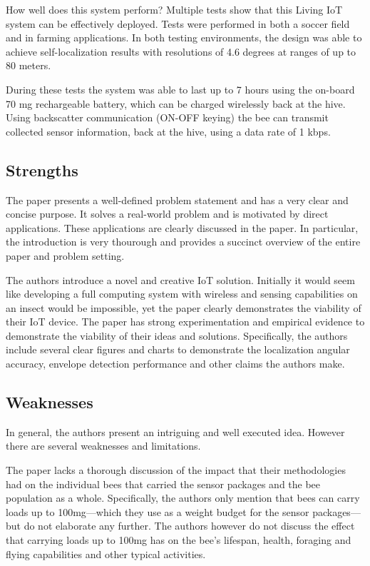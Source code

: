 \documentclass[letterpaper,twocolumn,10pt]{article}
\begin{document}
How well does this system perform? Multiple tests show that this Living IoT system can be effectively deployed. Tests were performed in both a soccer field and in farming applications. In both testing environments, the design was able to achieve self-localization results with resolutions of 4.6 degrees at ranges of up to 80 meters. 

During these tests the system was able to last up to 7 hours using the on-board 70 mg rechargeable battery, which can be charged wirelessly back at the hive. Using backscatter communication (ON-OFF keying) the bee can transmit collected sensor information, back at the hive, using a data rate of 1 kbps. 

\subsection*{Strengths}

The paper presents a well-defined problem statement and has a very clear and concise purpose. It solves a real-world problem and is motivated by direct applications. These applications are clearly discussed in the paper. In particular, the introduction is very thourough and provides a succinct overview of the entire paper and problem setting.

The authors introduce a novel and creative IoT solution. Initially it would seem like developing a full computing system with wireless and sensing capabilities on an insect would be impossible, yet the paper clearly demonstrates the viability of their IoT device. The paper has strong experimentation and empirical evidence to demonstrate the viability of their ideas and solutions. Specifically, the authors include several clear figures and charts to demonstrate the localization angular accuracy, envelope detection performance and other claims the authors make.

\subsection*{Weaknesses}

In general, the authors present an intriguing and well executed idea. However there are several weaknesses and limitations.

The paper lacks a thorough discussion of the impact that their methodologies had on the individual bees that carried the sensor packages and the bee population as a whole. Specifically, the authors only mention that bees can carry loads up to 100mg---which they use as a weight budget for the sensor packages---but do not elaborate any further. The authors however do not discuss the effect that carrying loads up to 100mg has on the bee's lifespan, health, foraging and flying capabilities and other typical activities.
\end{document}
